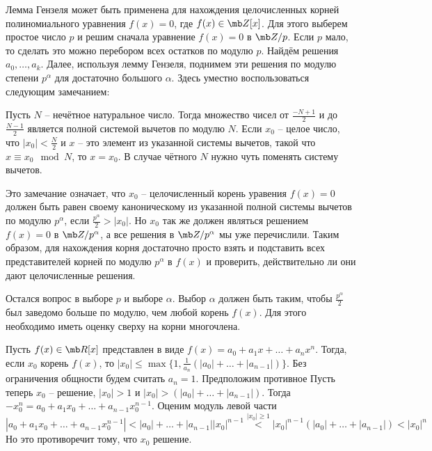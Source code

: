 Лемма Гензеля может быть применена для нахождения целочисленных корней полиномиального уравнения $f(x)=0$, где $f(x)\in \mb Z[x]$. Для этого выберем простое число $p$ и решим сначала уравнение $f(x)=0$ в $\mb Z/p$. Если $p$ мало, то сделать это можно перебором всех остатков по модулю $p$. Найдём решения $a_0,\dots,a_k$. Далее, используя лемму Гензеля, поднимем эти решения по модулю степени $p^{\alpha}$ для достаточно большого $\alpha$. Здесь уместно воспользоваться следующим замечанием:

\rm Пусть $N$ -- нечётное натуральное число. Тогда множество чисел от $\frac{-N+1}{2}$ и до $\frac{N-1}{2}$ является полной системой вычетов по модулю $N$. Если $x_0$ -- целое число, что $|x_0| <\frac{N}{2}$  и $x$ -- это элемент из указанной системы вычетов, такой что $x\equiv x_0 \mod N$, то $x=x_0$.
В случае чётного $N$ нужно чуть поменять систему вычетов.
\erm

Это замечание означает, что $x_0$ -- целочисленный корень уравения $f(x)=0$ должен быть равен своему каноническому  из указанной полной системы вычетов по модулю $p^{\alpha}$, если $\frac{p^{\alpha}}{2}> |x_0|$. Но $x_0$ так же должен являться решением $f(x)=0$ в $\mb Z/p^{\alpha}$, а все решения в $\mb Z/p^{\alpha}$ мы уже перечислили. Таким образом, для нахождения корня достаточно просто взять и подставить всех представителей корней по модулю $p^{\alpha}$ в $f(x)$ и проверить, действительно ли они дают целочисленные решения.  

Остался вопрос в выборе $p$ и выборе $\alpha$. Выбор $\alpha$ должен быть таким, чтобы $\frac{p^\alpha}{2}$ был заведомо больше по модулю, чем любой корень $f(x)$. Для этого необходимо иметь оценку сверху на корни многочлена.

\lm Пусть $f(x) \in \mb R[x]$ представлен в виде $f(x)=a_0+a_1x+\dots+a_n x^n$. Тогда, если $x_0$ корень $f(x)$, то $|x_0|\leq \max\{1,\frac{1}{a_n}(|a_0|+\dots+|a_{n-1}|)\}$. 
\elm
\proof  Без ограничения общности будем считать $a_n=1$. Предположим противное Пусть теперь $x_0$ -- решение, $|x_0|> 1$ и $|x_0|> (|a_0|+\dots+|a_{n-1}|)$. Тогда $-x_0^n=a_0+a_1x_0+\dots+a_{n-1} x_0^{n-1}$. Оценим модуль левой части 
$$|a_0+a_1x_0+\dots+a_{n-1} x_0^{n-1}|< |a_0|+\dots+|a_{n-1}| |x_0|^{n-1} \stackrel{|x_0|\geq 1}{<} |x_0|^{n-1}(|a_0|+\dots+|a_{n-1}|) < |x_0|^n$$
Но это противоречит тому, что $x_0$ решение.
\endproof

